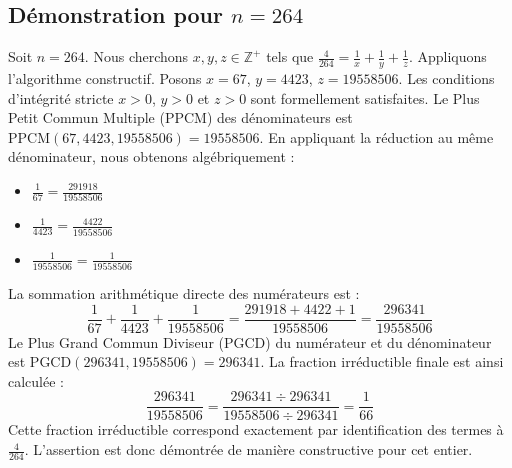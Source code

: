 \documentclass[11pt,a4paper]{article}
\begin{document}
\subsection{Démonstration pour $n = 264$}
Soit $n = 264$. Nous cherchons $x, y, z \in \mathbb{Z}^{+}$ tels que $\frac{4}{264} = \frac{1}{x} + \frac{1}{y} + \frac{1}{z}$.
Appliquons l'algorithme constructif. Posons $x = 67$, $y = 4423$, $z = 19558506$.
Les conditions d'intégrité stricte $x > 0$, $y > 0$ et $z > 0$ sont formellement satisfaites.
Le Plus Petit Commun Multiple (PPCM) des dénominateurs est $\text{PPCM}(67, 4423, 19558506) = 19558506$.
En appliquant la réduction au même dénominateur, nous obtenons algébriquement :
\begin{itemize}
    \item $\frac{1}{67} = \frac{291918}{19558506}$
    \item $\frac{1}{4423} = \frac{4422}{19558506}$
    \item $\frac{1}{19558506} = \frac{1}{19558506}$
\end{itemize}
La sommation arithmétique directe des numérateurs est :
$$ \frac{1}{67} + \frac{1}{4423} + \frac{1}{19558506} = \frac{291918 + 4422 + 1}{19558506} = \frac{296341}{19558506} $$
Le Plus Grand Commun Diviseur (PGCD) du numérateur et du dénominateur est $\text{PGCD}(296341, 19558506) = 296341$.
La fraction irréductible finale est ainsi calculée :
$$ \frac{296341}{19558506} = \frac{296341 \div 296341}{19558506 \div 296341} = \frac{1}{66} $$
Cette fraction irréductible correspond exactement par identification des termes à $\frac{4}{264}$. L'assertion est donc démontrée de manière constructive pour cet entier.
\end{document}

